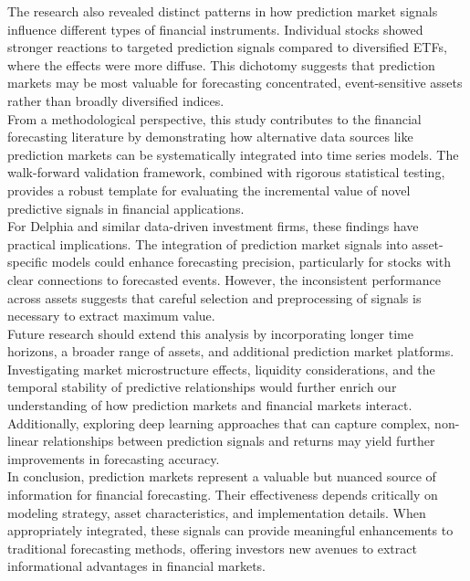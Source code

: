\documentclass[12pt]{report}
\begin{document}
The research also revealed distinct patterns in how prediction market signals influence different types of financial instruments. Individual stocks showed stronger reactions to targeted prediction signals compared to diversified ETFs, where the effects were more diffuse. This dichotomy suggests that prediction markets may be most valuable for forecasting concentrated, event-sensitive assets rather than broadly diversified indices.\\

From a methodological perspective, this study contributes to the financial forecasting literature by demonstrating how alternative data sources like prediction markets can be systematically integrated into time series models. The walk-forward validation framework, combined with rigorous statistical testing, provides a robust template for evaluating the incremental value of novel predictive signals in financial applications.\\

For Delphia and similar data-driven investment firms, these findings have practical implications. The integration of prediction market signals into asset-specific models could enhance forecasting precision, particularly for stocks with clear connections to forecasted events. However, the inconsistent performance across assets suggests that careful selection and preprocessing of signals is necessary to extract maximum value.\\

Future research should extend this analysis by incorporating longer time horizons, a broader range of assets, and additional prediction market platforms. Investigating market microstructure effects, liquidity considerations, and the temporal stability of predictive relationships would further enrich our understanding of how prediction markets and financial markets interact. Additionally, exploring deep learning approaches that can capture complex, non-linear relationships between prediction signals and returns may yield further improvements in forecasting accuracy.\\

In conclusion, prediction markets represent a valuable but nuanced source of information for financial forecasting. Their effectiveness depends critically on modeling strategy, asset characteristics, and implementation details. When appropriately integrated, these signals can provide meaningful enhancements to traditional forecasting methods, offering investors new avenues to extract informational advantages in financial markets.
\end{document}
